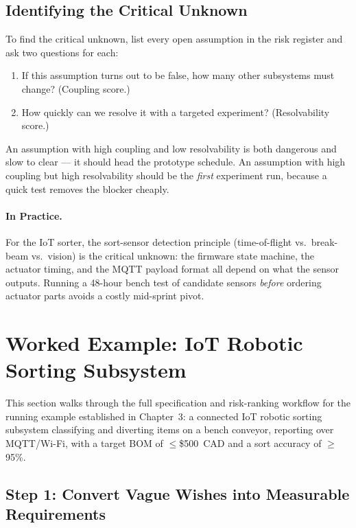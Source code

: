 \subsection{Identifying the Critical Unknown}
\label{subsec:ch4-identify-critical}

To find the critical unknown, list every open assumption in the risk register and ask two questions for each:
\begin{enumerate}
  \item If this assumption turns out to be false, how many other subsystems must change? (Coupling score.)
  \item How quickly can we resolve it with a targeted experiment? (Resolvability score.)
\end{enumerate}

An assumption with high coupling and low resolvability is both dangerous and slow to clear — it should head the prototype schedule.
An assumption with high coupling but high resolvability should be the \emph{first} experiment run, because a quick test removes the blocker cheaply.

\paragraph{In Practice.}
For the IoT sorter, the sort-sensor detection principle (time-of-flight vs.\ break-beam vs.\ vision) is the critical unknown: the firmware state machine, the actuator timing, and the MQTT payload format all depend on what the sensor outputs.
Running a 48-hour bench test of candidate sensors \emph{before} ordering actuator parts avoids a costly mid-sprint pivot.

\section{Worked Example: IoT Robotic Sorting Subsystem}
\label{sec:ch4-worked-example}

This section walks through the full specification and risk-ranking workflow for the running example established in Chapter~3: a connected IoT robotic sorting subsystem classifying and diverting items on a bench conveyor, reporting over MQTT/Wi-Fi, with a target BOM of $\leq$\$500~CAD and a sort accuracy of $\geq$95\%.

\subsection{Step 1: Convert Vague Wishes into Measurable Requirements}
\label{subsec:ch4-step1}


